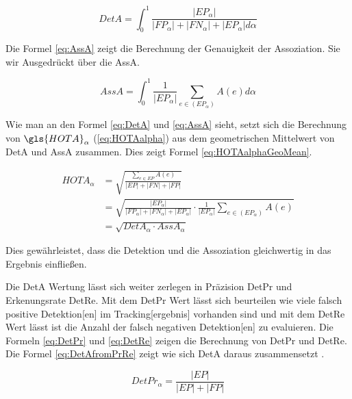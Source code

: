 \begin{equation}
    \label{eq:DetA}
    DetA = \int_{0}^{1} \frac{|EP_{\alpha}|}{|FP_{\alpha}| + |FN_{\alpha}| + |EP_{\alpha}| d\alpha}
\end{equation}

Die Formel \ref{eq:AssA} zeigt die Berechnung der Genauigkeit der \gls{Assoziation}. Sie wir Ausgedrückt über die \gls{AssA}. 

\begin{equation}
    \label{eq:AssA}
    AssA = \int_{0}^{1} \frac{1}{|EP_{\alpha}|} \sum_{e \in (EP_{\alpha})} A(e) d\alpha
\end{equation}

Wie man an den Formel \ref{eq:DetA} und \ref{eq:AssA} sieht, setzt sich die Berechnung von \(\gls{HOTA}_{\alpha}\) (\autoref{eq:HOTAalpha}) aus dem geometrischen Mittelwert von \gls{DetA} und \gls{AssA} zusammen. Dies zeigt Formel \ref{eq:HOTAalphaGeoMean}.

\begin{equation}
\begin{split}
    \label{eq:HOTAalphaGeoMean}
    HOTA_{\alpha} &= \sqrt{\frac{\sum_{e \in EP} A(e)}{|EP| + |FN| + |FP|}} \\ 
    &= \sqrt{\frac{|EP_{\alpha}|}{|FP_{\alpha}| + |FN_{\alpha}| + |EP_{\alpha}|} \cdot \frac{1}{|EP_{\alpha}|} \sum_{e \in (EP_{\alpha})} A(e)} \\ 
    &= \sqrt{DetA_{\alpha} \cdot AssA_{\alpha}}
\end{split}
\end{equation}

Dies gewährleistet, dass die \gls{Detektion} und die \gls{Assoziation} gleichwertig in das Ergebnis einfließen. \par

Die \gls{DetA} Wertung lässt sich weiter zerlegen in Präzision \gls{DetPr} und Erkenungsrate \gls{DetRe}. Mit dem \gls{DetPr} Wert lässt sich beurteilen wie viele falsch positive \gls{Detektion}[en] im \gls{Tracking}[ergebnis] vorhanden sind und mit dem \gls{DetRe} Wert lässt ist die Anzahl der falsch negativen \gls{Detektion}[en] zu evaluieren. Die Formeln \ref{eq:DetPr} und \ref{eq:DetRe} zeigen die Berechnung von \gls{DetPr} und \gls{DetRe}. Die Formel \ref{eq:DetAfromPrRe} zeigt wie sich \gls{DetA} daraus zusammensetzt \cite{HOTA}.

\begin{equation}
    \label{eq:DetPr}
    DetPr_{\alpha} = \frac{|EP|}{|EP| + |FP|}
\end{equation}

